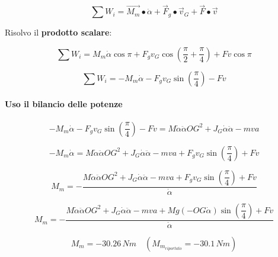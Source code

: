 \documentclass[main.tex]{subfiles}
\begin{document}
\[
	\sum W_i = \vec{M_m}\bullet\dot{\alpha} +  \vec{F}_g\bullet\vec{v}_G + \vec{F}\bullet\vec{v}
\]

Risolvo il \textbf{prodotto scalare}:

\[
	\sum W_i = M_m\dot{\alpha}\cos\pi + F_gv_G\cos\left( \dfrac{\pi}{2} + \dfrac{\pi}{4} \right) + Fv\cos\pi
\]

\[
	\sum W_i = -M_m\dot{\alpha} - F_gv_G\sin\left( \dfrac{\pi}{4} \right) - Fv
\]

\paragraph{Uso il bilancio delle potenze}

\begin{equation}
	-M_m\dot{\alpha} - F_gv_G\sin\left( \dfrac{\pi}{4} \right) - Fv = M\dot{\alpha}\ddot{\alpha}OG^2 + J_G\dot{\alpha}\ddot{\alpha} -mva
\end{equation}

\begin{equation}
	-M_m\dot{\alpha}  = M\dot{\alpha}\ddot{\alpha}OG^2 + J_G\dot{\alpha}\ddot{\alpha} -mva + F_gv_G\sin\left( \dfrac{\pi}{4} \right) + Fv
\end{equation}

\begin{equation}
	M_m  = -\dfrac{M\dot{\alpha}\ddot{\alpha}OG^2 + J_G\dot{\alpha}\ddot{\alpha} -mva + F_gv_G\sin\left( \dfrac{\pi}{4} \right) + Fv}{\dot{\alpha}}
\end{equation}

\begin{equation}
	M_m  = -\dfrac{M\dot{\alpha}\ddot{\alpha}OG^2 + J_G\dot{\alpha}\ddot{\alpha} -mva + Mg(-OG\dot{\alpha})\sin\left( \dfrac{\pi}{4} \right) + Fv}{\dot{\alpha}}
\end{equation}

\begin{equation}
	M_m = -30.26\,Nm \quad (M_{m_{riportato}} = -30.1\,Nm)
\end{equation}
\end{document}
